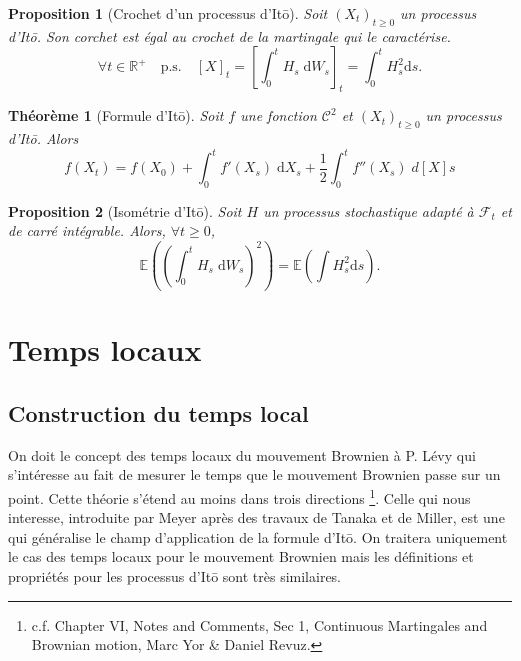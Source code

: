 \documentclass[openany]{book}
\newcommand{\F}{\mathscr{F}}
\newcommand{\R}{\mathbb{R}}
\newcommand{\E}{\mathbb{E}}
\newcommand{\1}{\mathbbm{1}}
\renewcommand{\d}{\mathrm{d}}
\theoremstyle{thmfont}
\newtheorem{theorem}{Théorème}[chapter]
\theoremstyle{deffont}
\theoremstyle{thmfont}
\newtheorem{prop}[prop]{Proposition}
\theoremstyle{deffont}
\begin{document}
 \begin{prop}[Crochet d'un processus d'Itō] Soit $(X_t)_{t\geq0}$ un processus d'Itō. Son corchet est égal au crochet de la martingale qui le caractérise.
   $$\forall t \in  \R^+ \quad\text{p.s.}\quad [X]_t = \left[\int_0^tH_s \;\d W_s\right]_t = \int_0^t H_s^2 \d s.$$
  \end{prop}

  \begin{theorem}[Formule d'Itō]
  Soit $f$ une fonction $\mathcal C^2$ et $(X_t)_{t\geq0}$ un processus d'Itō. Alors
  \begin{equation}
    f(X_t) = f(X_0) + \int_0^t f'(X_s) \;\d X_s + \dfrac{1}{2} \int_0^t f''(X_s) \;d[X]s
  \end{equation}
  \end{theorem}

\begin{prop}[Isométrie d'Itō] Soit $H$ un processus stochastique adapté à $\F_t$ et de carré intégrable. Alors, $\forall t \geq 0$,
  \begin{equation}
    \E\left( \left(\int_0^t H_s \;\d W_s\right)^2\right) = \E\left( \int H_s^2 \d s\right).
  \end{equation}
  

  \end{prop}
\chapter{Temps locaux}

\section{Construction du temps local}\label{sec:ConstrTempsLoc}

On doit le concept des temps locaux du mouvement Brownien à P. Lévy qui s’intéresse au fait de mesurer le temps que le mouvement Brownien passe sur un point. Cette théorie s'étend au moins dans trois directions
\footnote{c.f. Chapter VI, Notes and Comments, Sec 1, Continuous Martingales and Brownian motion, Marc Yor \& Daniel Revuz.}.
Celle qui nous interesse, introduite par Meyer après des travaux de Tanaka et de Miller, est une qui généralise le champ d'application de la formule d'Itō. On traitera uniquement le cas des temps locaux pour le mouvement Brownien mais les définitions et propriétés pour les processus d'Itō sont très similaires.\\
\end{document}

